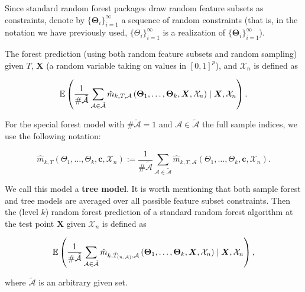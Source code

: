 Since standard random forest packages draw random feature subsets as constraints, denote by \(\{\boldsymbol{\Theta}_i \}_{i=1}^\infty\) a sequence of random constraints (that is, in the notation we have previously used, \(\{\Theta_i \}_{i=1}^\infty\) is a realization of \(\{\boldsymbol{\Theta}_i \}_{i=1}^\infty\)).

\begin{definition}

The forest prediction (using both random feature subsets and random sampling) given \(T\), \(\boldsymbol{X}\) (a random variable taking on values in \([0,1]^p\)), and \(\mathcal{X}_n\) is defined as

\[
\mathbb{E} \left( \frac{1}{\# \tilde{\mathcal{A}}} \sum_{\mathcal{A} \in \tilde{\mathcal{A}}} \hat{m}_{k, T, \mathcal{A}}\left(\boldsymbol{\Theta}_1, \ldots, \boldsymbol{\Theta}_k, \boldsymbol{X}, \mathcal{X}_n\right) \mid \boldsymbol{X}, \mathcal{X}_n  \right).
\]

For the special forest model with \(\# \tilde{\mathcal{A}} = 1\) and \(\mathcal{A} \in \tilde{\mathcal{A}}\) the full sample indices, we use the following notation:

\begin{equation}\label{stat.learn.rf.full.inds.spec}
\hat{m}_{k, T} (\Theta_1, \ldots, \Theta_k, \boldsymbol{c}, \mathcal{X}_n) := \frac{1}{\# \tilde{\mathcal{A}}} \sum_{\mathcal{A} \in \tilde{\mathcal{A}}} \hat{m}_{k, T, \mathcal{A}} (\Theta_1, \ldots, \Theta_k, \boldsymbol{c}, \mathcal{X}_n).
\end{equation}

We call this model a \textbf{tree model}. It is worth mentioning that both sample forest and tree models are averaged over all possible feature subset constraints. Then the (level \(k\)) random forest prediction of a standard random forest algorithm at the test point \(\boldsymbol{X}\) given \(\mathcal{X}_n\) is defined as 

\begin{equation}\label{stat.learn.rf.pred.full}
\mathbb{E} \left( \frac{1}{\# \tilde{\mathcal{A}}} \sum_{\mathcal{A} \in \tilde{\mathcal{A}}} \hat{m}_{k, \hat{T}_{(n, \mathcal{A})}, \mathcal{A}}\left(\boldsymbol{\Theta}_1, \ldots, \boldsymbol{\Theta}_k, \boldsymbol{X}, \mathcal{X}_n\right) \mid \boldsymbol{X}, \mathcal{X}_n  \right),
\end{equation}

where \(\tilde{\mathcal{A}}\) is an arbitrary given set.

\end{definition}

